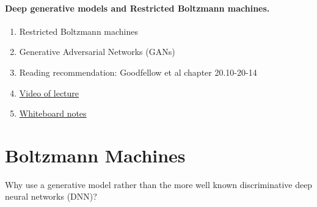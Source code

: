 \documentclass[%
oneside,                 %
final,                   %
10pt]{article}
\begin{document}
\paragraph{Deep generative models and Restricted Boltzmann machines.}
\begin{enumerate}
\item Restricted Boltzmann machines

\item Generative Adversarial Networks (GANs)

\item Reading recommendation: Goodfellow et al chapter 20.10-20-14

\item \href{{https://youtu.be/}}{Video of lecture}

\item \href{{https://github.com/CompPhysics/AdvancedMachineLearning/blob/main/doc/HandwrittenNotes/NotesApr262023.pdf}}{Whiteboard notes}
\end{enumerate}

\noindent



\section*{Boltzmann Machines}

Why use a generative model rather than the more well known discriminative deep neural networks (DNN)? 
\end{document}
